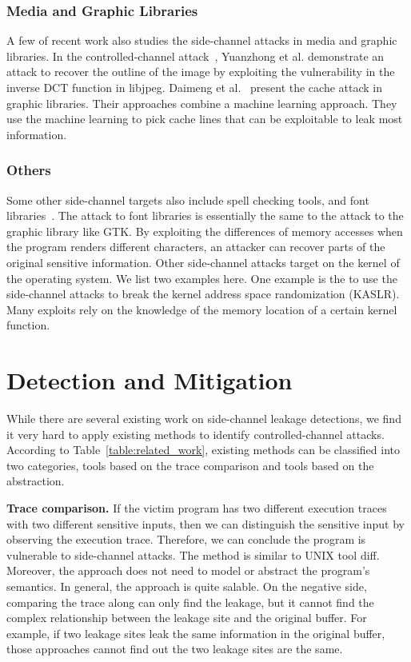 \subsubsection{Media and Graphic Libraries}
A few of recent work also studies the side-channel attacks in media and graphic libraries. In the controlled-channel attack~\cite{xu2015controlled}, Yuanzhong et al. demonstrate an attack to recover the outline of the image by exploiting the vulnerability in the inverse DCT function in libjpeg. Daimeng et al.~\cite{wang2019unveiling} present the cache attack in graphic libraries. Their approaches combine a machine learning approach. They use the machine learning to pick cache lines that can be exploitable to leak most information.
\subsubsection{Others}
Some other side-channel targets also include spell checking tools, and font libraries~\cite{xu2015controlled}. The attack to font libraries is essentially the same to the attack to the graphic library like GTK. By exploiting the differences of memory accesses when the program renders different characters, an attacker can recover parts of the original sensitive information. Other side-channel attacks target on the kernel of the operating system. We list two examples here. One example is the to use the side-channel attacks to break the kernel address space randomization (KASLR).
Many exploits rely on the knowledge of the memory location of a certain kernel function.
\section{Detection and Mitigation}
While there are several existing work on side-channel leakage detections, we find it very hard to apply existing methods to identify controlled-channel attacks. According to Table~\ref{table:related_work}, existing methods can be classified into two categories, tools based on the trace comparison and tools based on the abstraction. 

\textbf{Trace comparison.} If the victim program has two different execution traces with two different sensitive inputs, then we can distinguish the sensitive input by observing the execution trace. Therefore, we can conclude the program is vulnerable to side-channel attacks. The method is similar to UNIX tool \textsf{diff}. Moreover, the approach does not need to model or abstract the program's semantics. In general, the approach is quite salable. On the negative side, comparing the trace along can only find the leakage, but it cannot find the complex relationship between the leakage site and the original buffer. For example, if two leakage sites leak the same information in the original buffer, those approaches cannot find out the two leakage sites are the same. 

